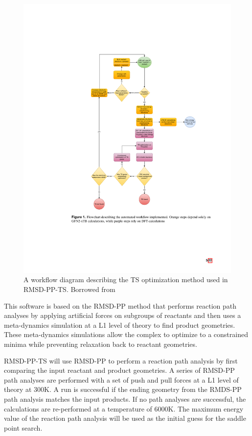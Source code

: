 \documentclass[preprint, 11pt]{elsarticle} %
\begin{document}
\begin{figure}[htbp]
    \centering
    \includegraphics{rsmd}
    \caption{A workflow diagram describing the TS optimization method used in RMSD-PP-TS. Borrowed from \cite{rasmussen:2020}}
    \label{fig:rmsd}
\end{figure}

This software is based on the RMSD-PP method \cite{Grimme:2019} that performs reaction path analyses by applying artificial forces on subgroups of reactants and then uses a meta-dynamics simulation at a L1 level of theory to find product geometries.
These meta-dynamics simulations allow the complex to optimize to a constrained minima while preventing relaxation back to reactant geometries.

RMSD-PP-TS will use RMSD-PP to perform a reaction path analysis by first comparing the input reactant and product geometries.
A series of RMSD-PP path analyses are performed with a set of push and pull forces at a L1 level of theory at 300K.
A run is successful if the ending geometry from the RMDS-PP path analysis matches the input products.
If no path analyses are successful, the calculations are re-performed at a temperature of 6000K. 
The maximum energy value of the reaction path analysis will be used as the initial guess for the saddle point search. 
\end{document}
